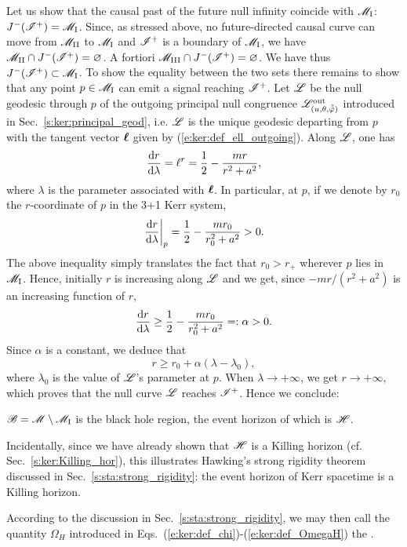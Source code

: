 Let us show that the causal past of the future null infinity
coincide with $\mathscr{M}_{\rm I}$: $J^{-}(\mathscr{I}^+)=\mathscr{M}_{\rm I}$.
Since, as stressed above, no future-directed causal curve can move from $\mathscr{M}_{\rm II}$ to $\mathscr{M}_{\rm I}$
and $\mathscr{I}^+$ is a boundary of $\mathscr{M}_{\rm I}$, we have $\mathscr{M}_{\rm II} \cap J^{-}(\mathscr{I}^+) = \varnothing$. A fortiori $\mathscr{M}_{\rm III} \cap J^{-}(\mathscr{I}^+) = \varnothing$.
We have thus $J^{-}(\mathscr{I}^+)\subset \mathscr{M}_{\rm I}$. To show the equality between the
two sets there remains to show
that any point $p\in \mathscr{M}_{\rm I}$ can emit a signal reaching $\mathscr{I}^+$.
Let $\mathscr{L}$ be the null geodesic through $p$ of the outgoing principal null
congruence $\mathscr{L}^{\rm out}_{(u,\theta,\tilde{{\tilde\varphi}})}$ introduced in Sec.~\ref{s:ker:principal_geod}, i.e. $\mathscr{L}$ is the unique geodesic departing
from $p$ with the tangent vector $\bm{\ell}$ given by
(\ref{e:ker:def_ell_outgoing}). Along $\mathscr{L}$, one has
\[
   \frac{\mathrm{d} r}{\mathrm{d}\lambda} = \ell^r = \frac{1}{2} - \frac{m r}{r^2 + a^2} ,
\]
where $\lambda$ is the parameter associated with $\bm{\ell}$.
In particular, at $p$, if we denote by $r_0$ the $r$-coordinate of $p$ in the 3+1 Kerr system,
\[
    \left. \frac{\mathrm{d} r}{\mathrm{d}\lambda} \right| _{p} = \frac{1}{2} - \frac{m r_0}{r_0^2 + a^2} > 0 .
\]
The above inequality simply translates the fact that $r_0 > r_+$ wherever $p$ lies in
$\mathscr{M}_{\rm I}$.
Hence, initially $r$ is increasing along $\mathscr{L}$ and we get, since $-mr/(r^2+a^2)$ is an
increasing function of $r$,
\[
    \frac{\mathrm{d} r}{\mathrm{d}\lambda} \geq \frac{1}{2} - \frac{m r_0}{r_0^2 + a^2} =: \alpha > 0.
\]
Since $\alpha$ is a constant, we deduce that
\[
    r \geq r_0 + \alpha(\lambda - \lambda_0) ,
\]
where $\lambda_0$ is the value of $\mathscr{L}$'s parameter at $p$. When $\lambda\rightarrow +\infty$,
we get $r\rightarrow +\infty$, which proves that the null curve $\mathscr{L}$
reaches $\mathscr{I}^+$. Hence we conclude:
\begin{greybox}
$\mathscr{B} = \mathscr{M} \setminus \mathscr{M}_{\rm I}$ is the black hole region, the event
horizon of which is $\mathscr{H}$.
\end{greybox}
Incidentally, since we have already shown that $\mathscr{H}$ is a Killing horizon
(cf. Sec.~\ref{s:ker:Killing_hor}),
this illustrates Hawking's strong rigidity theorem discussed
in Sec.~\ref{s:sta:strong_rigidity}: the event horizon of Kerr spacetime
is a Killing horizon.

According to the discussion in Sec.~\ref{s:sta:strong_rigidity}, we may then
call the quantity $\Omega_H$ introduced in
Eqs.~(\ref{e:ker:def_chi})-(\ref{e:ker:def_OmegaH}) the
.

